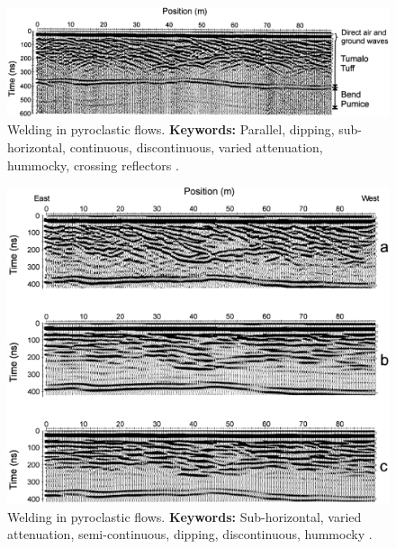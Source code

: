 \begin{figure}[h!]
    \centering
    \includegraphics[width=0.9\linewidth]{Figures/0.2GPR/Rust2000_pyroclast_1.png}
    \caption[Welding in pyroclastic flows pre-migration.]{Welding in pyroclastic flows. \textbf{Keywords: } Parallel, dipping, sub-horizontal, continuous, discontinuous, varied attenuation, hummocky, crossing reflectors \citep{Rust2000}.}
    \label{fig:Rust2000-1}
\end{figure}

\begin{figure}[h!]
    \centering
    \includegraphics[width=0.9\linewidth]{Figures/0.2GPR/Rust2000_pyroclast_2.png}
    \caption[Welding in pyroclastic flows post-migration.]{Welding in pyroclastic flows. \textbf{Keywords: } Sub-horizontal, varied attenuation, semi-continuous, dipping, discontinuous, hummocky \citep{Rust2000}.}
    \label{fig:Rust2000-2}
\end{figure}
\clearpage


